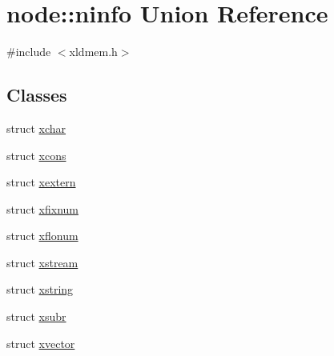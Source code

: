 \hypertarget{unionnode_1_1ninfo}{}\section{node\+:\+:ninfo Union Reference}
\label{unionnode_1_1ninfo}


{\ttfamily \#include $<$xldmem.\+h$>$}

\subsection*{Classes}
\begin{DoxyCompactItemize}
\item 
struct \hyperlink{structnode_1_1ninfo_1_1xchar}{xchar}
\item 
struct \hyperlink{structnode_1_1ninfo_1_1xcons}{xcons}
\item 
struct \hyperlink{structnode_1_1ninfo_1_1xextern}{xextern}
\item 
struct \hyperlink{structnode_1_1ninfo_1_1xfixnum}{xfixnum}
\item 
struct \hyperlink{structnode_1_1ninfo_1_1xflonum}{xflonum}
\item 
struct \hyperlink{structnode_1_1ninfo_1_1xstream}{xstream}
\item 
struct \hyperlink{structnode_1_1ninfo_1_1xstring}{xstring}
\item 
struct \hyperlink{structnode_1_1ninfo_1_1xsubr}{xsubr}
\item 
struct \hyperlink{structnode_1_1ninfo_1_1xvector}{xvector}
\end{DoxyCompactItemize}
